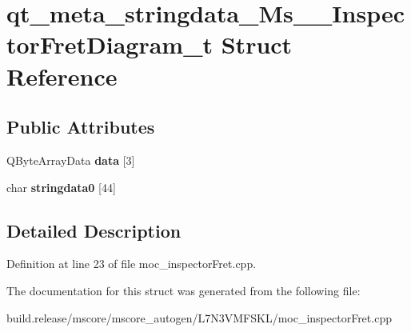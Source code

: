 \hypertarget{structqt__meta__stringdata___ms_____inspector_fret_diagram__t}{}\section{qt\+\_\+meta\+\_\+stringdata\+\_\+\+Ms\+\_\+\+\_\+\+Inspector\+Fret\+Diagram\+\_\+t Struct Reference}
\label{structqt__meta__stringdata___ms_____inspector_fret_diagram__t}
\subsection*{Public Attributes}
\begin{DoxyCompactItemize}
\item 
\mbox{\label{structqt__meta__stringdata___ms_____inspector_fret_diagram__t_a65c4aa234f3d93e5b93a492c8af7099d}} 
Q\+Byte\+Array\+Data {\bfseries data} \mbox{[}3\mbox{]}
\item 
\mbox{\label{structqt__meta__stringdata___ms_____inspector_fret_diagram__t_a7d69580e4b816724a204c7b54ce7d843}} 
char {\bfseries stringdata0} \mbox{[}44\mbox{]}
\end{DoxyCompactItemize}


\subsection{Detailed Description}


Definition at line 23 of file moc\+\_\+inspector\+Fret.\+cpp.



The documentation for this struct was generated from the following file\+:\begin{DoxyCompactItemize}
\item 
build.\+release/mscore/mscore\+\_\+autogen/\+L7\+N3\+V\+M\+F\+S\+K\+L/moc\+\_\+inspector\+Fret.\+cpp\end{DoxyCompactItemize}
